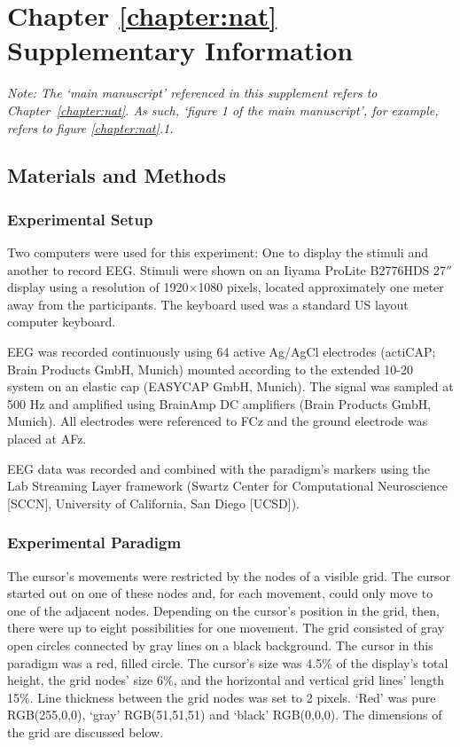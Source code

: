 
\chapter*{Chapter \ref{chapter:nat} Supplementary Information}

\noindent\emph{Note: The `main manuscript' referenced in this supplement refers to Chapter~\ref{chapter:nat}. As such, `figure 1 of the main manuscript', for example, refers to figure \ref{chapter:nat}.1.}


\section*{Materials and Methods}


\subsection*{Experimental Setup}

Two computers were used for this experiment: One to display the stimuli and another to record EEG. Stimuli were shown on an Iiyama ProLite B2776HDS 27$''$ display using a resolution of 1920$\times$1080 pixels, located approximately one meter away from the participants. The keyboard used was a standard US layout computer keyboard.

EEG was recorded continuously using 64 active Ag/AgCl electrodes (actiCAP; Brain Products GmbH, Munich) mounted according to the extended 10-20 system on an elastic cap (EASYCAP GmbH, Munich). The signal was sampled at 500 Hz and amplified using BrainAmp DC amplifiers (Brain Products GmbH, Munich). All electrodes were referenced to FCz and the ground electrode was placed at AFz.

EEG data was recorded and combined with the paradigm's markers using the Lab Streaming Layer framework (Swartz Center for Computational Neuroscience [SCCN], University of California, San Diego [UCSD]).


\subsection*{Experimental Paradigm}

The cursor's movements were restricted by the nodes of a visible grid. The cursor started out on one of these nodes and, for each movement, could only move to one of the adjacent nodes. Depending on the cursor's position in the grid, then, there were up to eight possibilities for one movement. The grid consisted of gray open circles connected by gray lines on a black background. The cursor in this paradigm was a red, filled circle. The cursor's size was 4.5\% of the display's total height, the grid nodes' size 6\%, and the horizontal and vertical grid lines' length 15\%. Line thickness between the grid nodes was set to 2 pixels. `Red' was pure \textsc{RGB}(255,0,0), `gray' \textsc{RGB}(51,51,51) and `black' \textsc{RGB}(0,0,0). The dimensions of the grid are discussed below.

